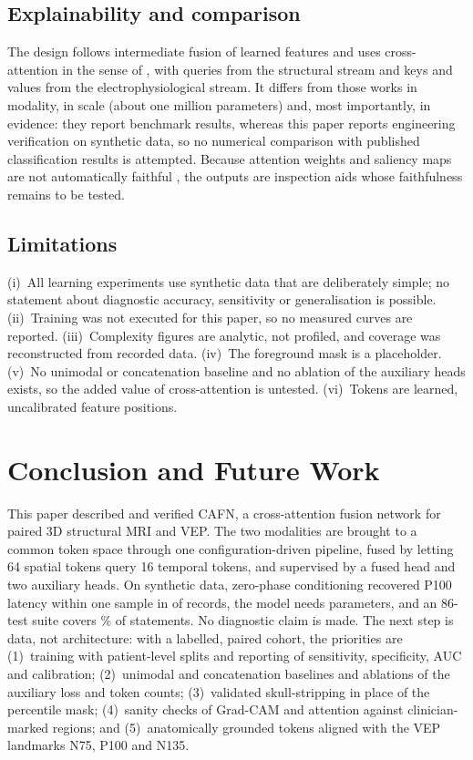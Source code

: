 \documentclass{ieeeaccessapprox}
\begin{document}
\subsection{Explainability and comparison}
The design follows intermediate fusion of learned features \cite{baltrusaitis2019,ramachandram2017} and uses cross-attention in the sense of \cite{tsai2019,lu2019}, with queries from the structural stream and keys and values from the electrophysiological stream. It differs from those works in modality, in scale (about one million parameters) and, most importantly, in evidence: they report benchmark results, whereas this paper reports engineering verification on synthetic data, so no numerical comparison with published classification results is attempted. Because attention weights and saliency maps are not automatically faithful \cite{jain2019,wiegreffe2019,adebayo2018}, the outputs are inspection aids whose faithfulness remains to be tested.

\subsection{Limitations}
(i)~All learning experiments use synthetic data that are deliberately simple; no statement about diagnostic accuracy, sensitivity or generalisation is possible. (ii)~Training was not executed for this paper, so no measured curves are reported. (iii)~Complexity figures are analytic, not profiled, and coverage was reconstructed from recorded data. (iv)~The foreground mask is a placeholder. (v)~No unimodal or concatenation baseline and no ablation of the auxiliary heads exists, so the added value of cross-attention is untested. (vi)~Tokens are learned, uncalibrated feature positions.

\section{Conclusion and Future Work}\label{sec:conclusion}
This paper described and verified CAFN, a cross-attention fusion network for paired 3D structural MRI and VEP. The two modalities are brought to a common token space through one configuration-driven pipeline, fused by letting 64 spatial tokens query 16 temporal tokens, and supervised by a fused head and two auxiliary heads. On synthetic data, zero-phase conditioning recovered P100 latency within one sample in \nWithin{} of \nTrials{} records, the model needs \nParams{} parameters, and an 86-test suite covers \covTotal\% of statements. No diagnostic claim is made. The next step is data, not architecture: with a labelled, paired cohort, the priorities are (1)~training with patient-level splits and reporting of sensitivity, specificity, AUC and calibration; (2)~unimodal and concatenation baselines and ablations of the auxiliary loss and token counts; (3)~validated skull-stripping in place of the percentile mask; (4)~sanity checks of Grad-CAM and attention against clinician-marked regions; and (5)~anatomically grounded tokens aligned with the VEP landmarks N75, P100 and N135.
\end{document}
